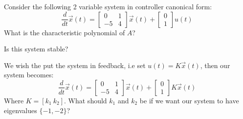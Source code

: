 
\begin{enumerate}

\qitem Consider the following 2 variable system in controller canonical form:
$$
\frac{d}{dt}\vec{x}(t) = 
\begin{bmatrix}
0 & 1 \\
-5 & 4
\end{bmatrix}
\vec{x}(t) +
\begin{bmatrix}
0 \\
1
\end{bmatrix}
u(t)
$$
What is the characteristic polynomial of $A$?





\qitem Is this system stable?



\qitem We wish the put the system in feedback, i.e set $u(t) = K\vec{x}(t)$, then our system becomes:
$$
\frac{d}{dt}\vec{x}(t) = 
\begin{bmatrix}
0 & 1 \\
-5 & 4
\end{bmatrix}
\vec{x}(t) +
\begin{bmatrix}
0 \\
1
\end{bmatrix}
K
\vec{x}(t)
$$
Where $K = [k_1~k_2]$. What should $k_1$ and $k_2$ be if we want our system to have eigenvalues $\{-1, -2\}$?


\end{enumerate}
